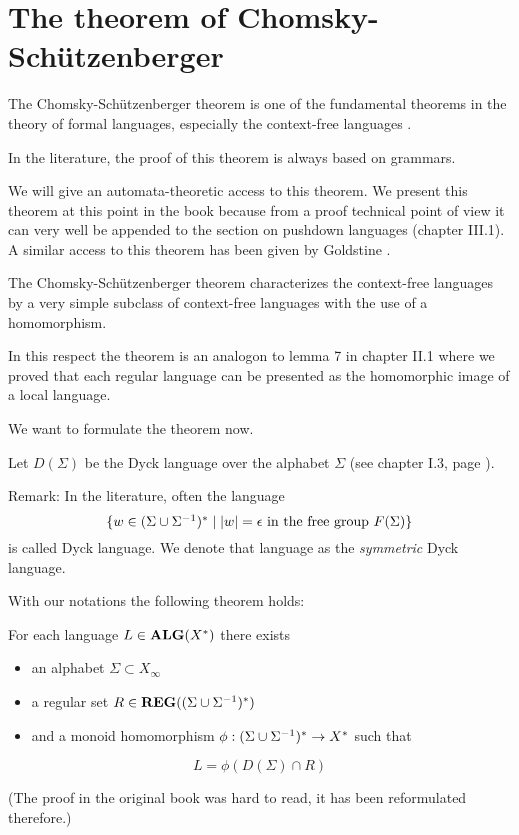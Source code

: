 \section{The theorem of Chomsky-Schützenberger}

The Chomsky-Schützenberger theorem is one of the fundamental theorems in the
theory of formal languages, especially the context-free languages \cite{ChSch}.

In the literature, the proof of this theorem is always based on grammars.

We will give an automata-theoretic access to this theorem. We present this
theorem at this point in the book because from a proof technical point of
view it can very well be appended to the section on pushdown languages
(chapter III.1). A similar access to this theorem has been given by Goldstine
 \cite{Goldstine77,Goldstine79,Goldstine80}.

The Chomsky-Schützenberger theorem characterizes the context-free languages
by a very simple subclass of context-free languages with the use of a
homomorphism.

In this respect the theorem is an analogon to lemma 7 in chapter II.1 where we
proved that each regular language can be presented as the homomorphic image of
a local language.

We want to formulate the theorem now.

Let $D(\Sigma)$ be the Dyck language over the alphabet $\Sigma$ (see chapter
I.3, page \pageref{dyck-language}).

Remark: In the literature, often the language \[ \mbox{$\{w\in
(\Sigma \cup {\Sigma}^{-1})^* \mid |w|= \epsilon\text{ in the free group }F(\Sigma)\}$} \]
is called Dyck language. We denote that language as the {\em symmetric} Dyck
language.

With our notations the following theorem holds:
\begin{theorem} For each language $L\in \mbox{{\bf ALG}}(X^*)$
there exists
\begin{itemize}
  \item an alphabet $\Sigma \subset X_\infty$
  \item a regular set $R\in \mbox{{\bf REG}}((\Sigma \cup {\Sigma}^{-1})^*)$
  \item and a monoid homomorphism $\phi: (\Sigma \cup {\Sigma}^{-1})^* \to X^*$ such
  that
\end{itemize}
\[ L = \phi(D(\Sigma)\cap R) \]
\end{theorem}

(The proof in the original book was hard to read, it has been reformulated
therefore.)

